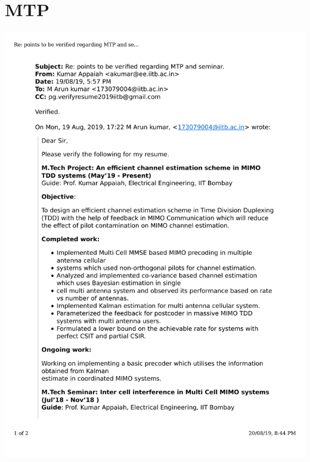 \documentclass{article}
\begin{document}
\section{MTP}
	\includegraphics[page=1, scale=0.5]{proofs/mtp.pdf}\\
\end{document}
